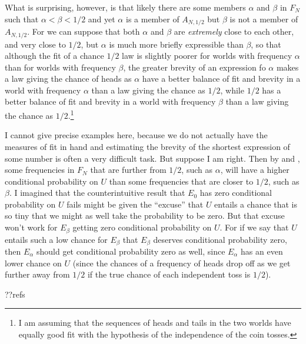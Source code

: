 What is surprising, however, is that likely  there are some members $\alpha$ and $\beta$ in $F_N$ such that $\alpha<\beta<1/2$
and yet $\alpha$ is a member of $A_{N,1/2}$ but $\beta$ is not a member of $A_{N,1/2}$. For we can suppose that both $\alpha$ and $\beta$
are \textit{extremely} close to each other, and very close to $1/2$, but $\alpha$ is much more briefly expressible than $\beta$, so that 
although the fit of a chance $1/2$ law is slightly poorer for worlds with frequency $\alpha$ than for worlds with frequency $\beta$,
the greater brevity of an expression fo $\alpha$ makes a law giving the chance of heads as $\alpha$ have a better balance of fit and
brevity in a world with frequency $\alpha$ than a law giving the chance as $1/2$, while $1/2$ has a better balance of fit and brevity in 
a world with frequency $\beta$ than a law giving the chance as $1/2$.\footnote{I am assuming that the sequences of heads and tails in 
the two worlds have equally good fit with the hypothesis of the independence of the coin tosses.} 

I cannot give precise examples here, because
we do not actually have the measures of fit in hand and estimating the brevity of the shortest expression of some number is often a very
difficult task. But suppose I am right. Then by  and , some frequencies in $F_N$ that are further from
$1/2$, such as $\alpha$, will have a higher conditional probability on $U$ than some frequencies that are closer to $1/2$, such as
$\beta$. I imagined that the counterintuitive result that $E_0$ has zero conditional probability on $U$ fails might be given the ``excuse''
that $U$ entails a chance that is so tiny that we might as well take the probability to be zero. But that excuse won't work for $E_\beta$
getting zero conditional probability on $U$. For if we say that $U$ entails such a low chance for $E_\beta$ that $E_\beta$ deserves
conditional probability zero, then $E_\alpha$ should get conditional probability zero as well, since $E_\alpha$ has an even lower chance
on $U$ (since the chances of a frequency of heads drop off as we get further away from $1/2$ if the true chance of each independent toss is $1/2$).

??refs

